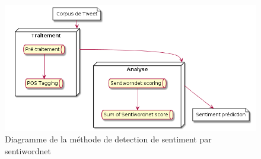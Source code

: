 \begin{figure}[h!]
	\centerline{\includegraphics[scale=0.6]{img/diagramme_sentiwordnet.png}}
	\caption{Diagramme de la méthode de detection de sentiment par sentiwordnet}
\end{figure}
